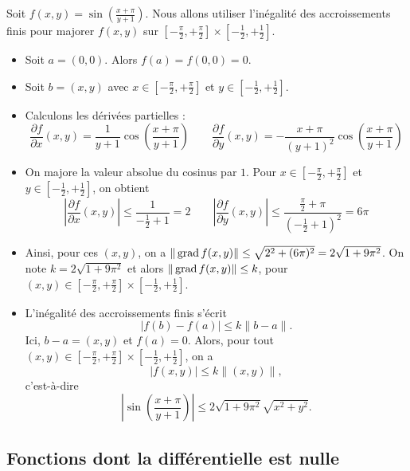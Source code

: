 \documentclass[11pt, class=report,crop=false]{standalone}
\begin{document}
\begin{exemple}
Soit $f(x,y) = \sin \left( \frac{x+\pi}{y+1} \right)$. 
Nous allons utiliser l'inégalité des accroissements finis pour majorer
$f(x,y)$ sur $[-\frac\pi2,+\frac\pi2] \times [-\frac12,+\frac12]$.

\begin{itemize}
  \item Soit $a=(0,0)$. Alors $f(a) = f(0,0) = 0$.
  
  \item Soit $b=(x,y)$ avec $x \in [-\frac\pi2,+\frac\pi2]$ et $y \in [-\frac12,+\frac12]$.
  
  
  \item Calculons les dérivées partielles :
  $$\frac{\partial f}{\partial x}(x,y) =  \frac{1}{y+1}\cos \left( \frac{x+\pi}{y+1} \right) \qquad
\frac{\partial f}{\partial y}(x,y) = - \frac{x+\pi}{(y+1)^2} \cos \left( \frac{x+\pi}{y+1} \right) $$  

  \item On majore la valeur absolue du cosinus par $1$. Pour  $x \in [-\frac\pi2,+\frac\pi2]$ et $y \in [-\frac12,+\frac12]$, on obtient
  $$ \left|\frac{\partial f}{\partial x}(x,y)\right| \le \frac{1}{-\frac12+1} = 2 \qquad
\left|\frac{\partial f}{\partial y}(x,y)\right| \le \frac{\frac\pi2+\pi}{(-\frac12+1)^2}  = 6\pi$$

  \item Ainsi, pour ces $(x,y)$, on a $\|\operatorname{grad} f(x,y)\| \le \sqrt{ 2^2 + (6\pi)^2} = 2\sqrt{1+9\pi^2}$.
  On note $k = 2\sqrt{1+9\pi^2}$ et alors $\| \operatorname{grad} f (x,y) \| \le  k$, pour $(x,y) \in [-\frac\pi2,+\frac\pi2] \times [-\frac12,+\frac12]$.
  
  
  \item L'inégalité des accroissements finis s'écrit 
 $$ \left| f(b)-f(a)  \right| \le k   \| b -a \|.$$
 Ici, $b-a = (x,y)$ et $f(a)=0$. Alors, pour tout $(x,y) \in [-\frac\pi2,+\frac\pi2] \times [-\frac12,+\frac12]$, on a
 $$\left| f(x,y) \right| \le k \| (x,y) \|,$$
c'est-à-dire 
 $$\left|  \sin \left( \frac{x+\pi}{y+1} \right) \right| \le 2\sqrt{1+9\pi^2} \sqrt{x^2+y^2}.$$ 
  
\end{itemize}



\end{exemple}


\subsection{Fonctions dont la différentielle est nulle}
 
\end{document}
